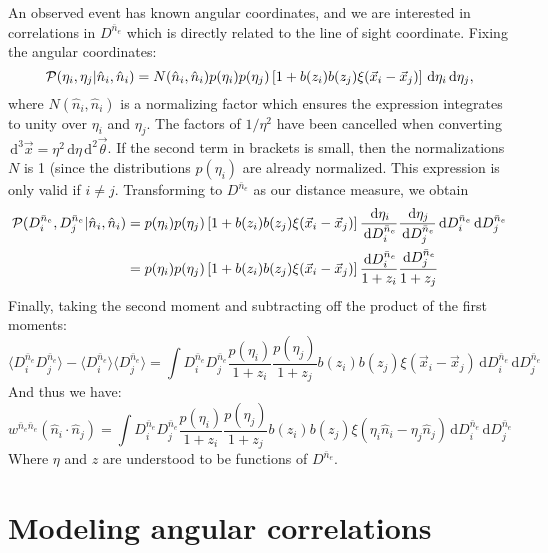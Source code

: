 \documentclass[onecolumn,prd,noshowpacs,nofootinbib,amsmath,amssymb]{revtex4}
\newcommand{\Dne}{D^{\bar{n}_e}}
\newcommand{\calP}{{\cal P}}
\newcommand{\ud}{\,\mathrm{d}}
\begin{document}
An observed event has known angular coordinates, and we are interested in
correlations in $\Dne$ which is directly related to the line of sight
coordinate.  Fixing the angular coordinates:
\begin{equation}
    \calP(\eta_i, \eta_j | \hat{n}_i, \hat{n}_i) = N(\hat{n}_i, \hat{n}_i)
    p(\eta_i)p(\eta_j) \left[ 1 + b(z_i)
    b(z_j) \xi(\vec x_i - \vec x_j) \right] \ud \eta_i \ud \eta_j,
\end{equation}
where $N(\hat{n}_i, \hat{n}_i)$ is a normalizing factor which ensures the
expression integrates to unity over $\eta_i$ and $\eta_j$. The factors of
$1/\eta^2$ have been cancelled when converting $\ud^3 \vec x = \eta^2 \ud \eta \ud^2
\vec \theta$. If the second term in brackets is small, then the normalizations
$N$ is 1 (since the distributions $p(\eta_i)$ are already normalized. 
This expression is
only valid if $i \ne j$.
Transforming to $\Dne$ as our distance measure, we obtain
\begin{align}
\calP(\Dne_i, \Dne_j | \hat{n}_i, \hat{n}_i)
    &= p(\eta_i)p(\eta_j) \left[ 1 + b(z_i)
        b(z_j) \xi(\vec x_i - \vec x_j) \right]
        \frac{\ud \eta_i}{\ud \Dne_i} \frac{\ud \eta_j}{\ud \Dne_j}
        \ud \Dne_i\ud \Dne_j
        \\
    &= p(\eta_i)p(\eta_j) \left[ 1 + b(z_i)
        b(z_j) \xi(\vec x_i - \vec x_j) \right]
        \frac{\ud \Dne_i}{1 + z_i}\frac{\ud \Dne_j}{1 + z_j}
\end{align}
Finally, taking the second moment and subtracting off the product of the first
moments:
\begin{equation}
\langle \Dne_i \Dne_j \rangle
    - \langle \Dne_i \rangle \langle \Dne_j \rangle =
    \int \Dne_i \Dne_j
    \frac{p(\eta_i)}{1 + z_i}\frac{p(\eta_j)}{1 + z_j}
    b(z_i) b(z_j) \xi(\vec x_i - \vec x_j)
        \ud \Dne_i\ud \Dne_j
\end{equation}
And thus we have:
\begin{equation}
    w^{\bar{n}_e \bar{n}_e}(\hat{n}_i\cdot\hat{n}_j)
        =\int \Dne_i \Dne_j
    \frac{p(\eta_i)}{1 + z_i}\frac{p(\eta_j)}{1 + z_j}
    b(z_i) b(z_j) \xi(\eta_i \hat{n}_i - \eta_j \hat{n}_j)
        \ud \Dne_i\ud \Dne_j
\end{equation}
Where $\eta$ and $z$ are understood to be functions of $\Dne$.



\section{Modeling angular correlations}
\end{document}
